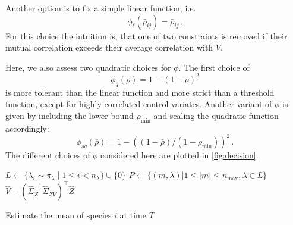 Another option is to fix a simple linear function, i.e.\ \[ \phi_{\ell}(\bar\rho_{ij})=\bar\rho_{ij}\,.\]
For this choice the intuition is, that one of two constraints is removed if their mutual
correlation exceeds their average correlation with $V$.


Here, we also assess two quadratic choices for $\phi$. The first choice of
\[
	\phi_{q}(\bar\rho)=1 - (1-\bar\rho)^2
\]
is more tolerant than the linear function and more strict than a threshold function, except for
highly correlated control  variates.
Another variant of $\phi$ is given by including the lower bound $\rho_{\min}$ and scaling
the quadratic function accordingly:
\[ \phi_{\mathit{sq}}(\bar\rho)=1-((1-\bar\rho)/(1-\rho_{\min}))^2\,.\]
The different choices of $\phi$ considered here are plotted in \autoref{fig:decision}.
\begin{algorithm}[ht]
  $L\leftarrow\{\lambda_i\sim \pi_\lambda \mid 1\leq i< n_{\lambda} \} \cup \{ 0 \}$\label{line:lambda_sample}\;
  $P \leftarrow \{ ({m}, \lambda) | 1\leq\lvert {m} \rvert \leq n_{\max}, \lambda\in L\}$\label{line:init_covs}\;
\Return $\hat{V} - {(\hat{\Sigma}_{{Z}}^{-1}\hat\Sigma_{{Z}V})}^{\top}\hat{{Z}}$\label{line:compute_lcv}\;
    \caption{\label{alg:ssa:lcv}Estimate the mean of species $i$ at time $T$}
\end{algorithm}
